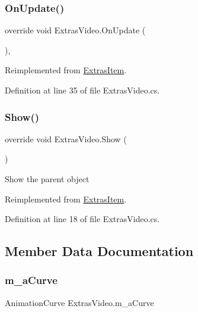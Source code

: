 \subsubsection{\texorpdfstring{On\+Update()}{OnUpdate()}}
{\footnotesize\ttfamily override void Extras\+Video.\+On\+Update (\begin{DoxyParamCaption}{ }\end{DoxyParamCaption})\hspace{0.3cm}{\ttfamily [protected]}, {\ttfamily [virtual]}}



Reimplemented from \mbox{\hyperlink{class_extras_item_ae6382773509ab96a451613b5bcaee0d8}{Extras\+Item}}.



Definition at line 35 of file Extras\+Video.\+cs.

\mbox{\label{class_extras_video_a3391788cf3302c1d3dc6eaf4223ea94c}} 
\subsubsection{\texorpdfstring{Show()}{Show()}}
{\footnotesize\ttfamily override void Extras\+Video.\+Show (\begin{DoxyParamCaption}{ }\end{DoxyParamCaption})\hspace{0.3cm}{\ttfamily [virtual]}}



Show the parent object 



Reimplemented from \mbox{\hyperlink{class_extras_item_a1ea08ab5d840866f8829d37d8149c277}{Extras\+Item}}.



Definition at line 18 of file Extras\+Video.\+cs.



\subsection{Member Data Documentation}
\mbox{\label{class_extras_video_ab6157f0e96d9bfadfc83a222eadd80e1}} 
\subsubsection{\texorpdfstring{m\+\_\+a\+Curve}{m\_aCurve}}
{\footnotesize\ttfamily Animation\+Curve Extras\+Video.\+m\+\_\+a\+Curve}




